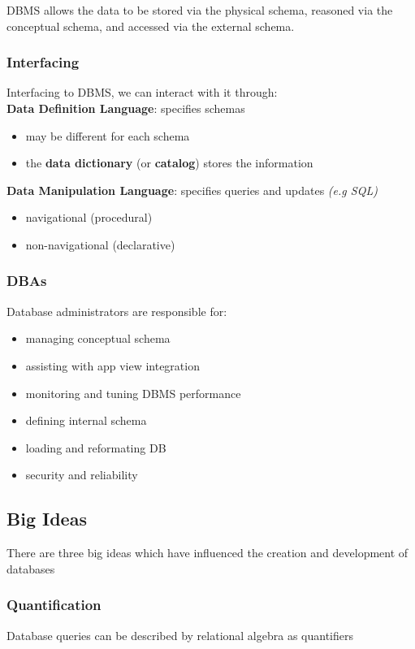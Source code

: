 \documentclass[]{article}
\theoremstyle{definition}
\begin{document}
				DBMS allows the data to be stored via the physical schema, reasoned via the conceptual schema, and accessed via the external schema.
	
			\subsubsection{Interfacing}
				Interfacing to DBMS, we can interact with it through: \\
				\textbf{Data Definition Language}: specifies schemas 
				\begin{itemize}
					\item may be different for each schema 
					\item the \textbf{data dictionary} (or \textbf{catalog}) stores the information
				\end{itemize}				

				\textbf{Data Manipulation Language}: specifies queries and updates \emph{(e.g SQL)}
				\begin{itemize}
					\item navigational (procedural)
					\item non-navigational (declarative)
				\end{itemize}								
				\subsubsection{DBAs}
				Database administrators are responsible for:
				\begin{itemize}
					\item managing conceptual schema
					\item assisting with app view integration
					\item monitoring and tuning DBMS performance
					\item defining internal schema
					\item loading and reformating DB
					\item security and reliability
				\end{itemize}
		\subsection{Big Ideas}
			There are three big ideas which have influenced the creation and development of databases
			\subsubsection{Quantification}
				Database queries can be described by relational algebra as quantifiers	
				
\end{document}
